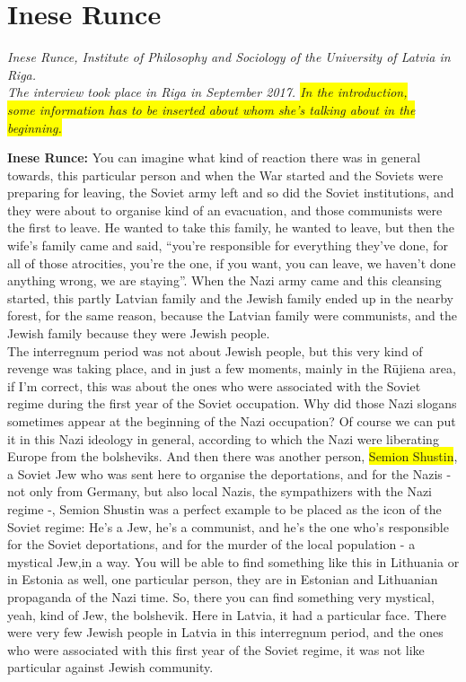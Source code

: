 \section{Inese Runce}

\textit{Inese Runce, Institute of Philosophy and Sociology of the University of Latvia in Riga.\\ 
The interview took place in Riga in September 2017.
\colorbox{yellow}{In the introduction,\\ some information has to be inserted about whom she's talking about in the beginning.}}\par
\vspace*{2em}
\textbf{Inese Runce:} You can imagine what kind of reaction there was in general towards, this particular person and when the War started and the Soviets were preparing for leaving, the Soviet army left and so did the Soviet institutions, and they were about to organise kind of an evacuation, and those communists were the first to leave.  He wanted to take this family, he wanted to leave, but then the wife's family came and said, ``you're responsible for everything they've done, for all of those atrocities, you're the one, if you want, you can leave, we haven't done anything wrong, we are staying''. When the Nazi army came and this cleansing started, this partly Latvian family and the Jewish family ended up in the nearby forest, for the same reason, because the Latvian family were communists, and the Jewish family because they were Jewish people.\\
The interregnum period was not about Jewish people, but this very kind of revenge was taking place, and in just a few moments, mainly in the Rūjiena area, if I'm correct, this was about the ones who were associated with the Soviet regime during the first year of the Soviet occupation. Why did those Nazi slogans sometimes appear at the beginning of the Nazi occupation? Of course we can put it in this Nazi ideology in general, according to which the Nazi were liberating Europe from the bolsheviks. And then there was another person, \colorbox{yellow}{Semion Shustin}, a Soviet Jew who was sent here to organise the  deportations, and for the Nazis - not only from Germany, but also local Nazis, the sympathizers with the Nazi regime -, Semion Shustin was a perfect example to be placed as the icon of the Soviet regime: He's a Jew, he's a communist, and he's the one who's responsible for the Soviet deportations, and for the murder of the local population - a mystical Jew,in a way. You will be able to find something like this in Lithuania or in Estonia as well, one particular person, they are in Estonian and Lithuanian propaganda of the Nazi time. So, there you can find something very mystical, yeah, kind of Jew, the bolshevik. Here in Latvia, it had a particular face. There were very few Jewish people in Latvia in this interregnum period, and the ones who were associated with this first year of the Soviet regime, it was not like particular against Jewish community.
	
